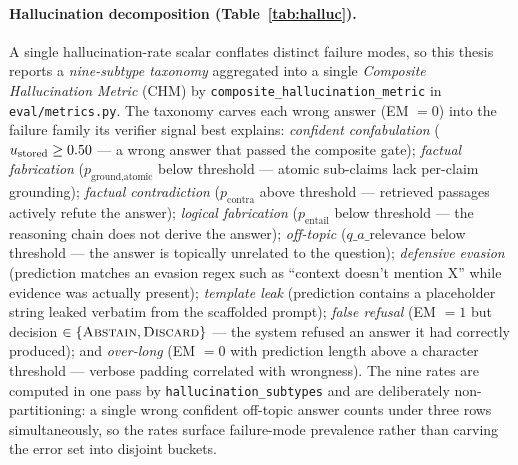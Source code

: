 \paragraph{Hallucination decomposition (Table~\ref{tab:halluc}).}
A single hallucination-rate scalar conflates distinct failure modes, so this thesis reports a \emph{nine-subtype taxonomy} aggregated into a single \emph{Composite Hallucination Metric} (CHM) by \texttt{composite\_hallucination\_metric} in \texttt{eval/metrics.py}. The taxonomy carves each wrong answer (EM $=0$) into the failure family its verifier signal best explains: \emph{confident confabulation} ($u_{\text{stored}} \geq 0.50$ --- a wrong answer that passed the composite gate); \emph{factual fabrication} ($p_{\text{ground,atomic}}$ below threshold --- atomic sub-claims lack per-claim grounding); \emph{factual contradiction} ($p_{\text{contra}}$ above threshold --- retrieved passages actively refute the answer); \emph{logical fabrication} ($p_{\text{entail}}$ below threshold --- the reasoning chain does not derive the answer); \emph{off-topic} ($q\_a\_\text{relevance}$ below threshold --- the answer is topically unrelated to the question); \emph{defensive evasion} (prediction matches an evasion regex such as ``context doesn't mention X'' while evidence was actually present); \emph{template leak} (prediction contains a placeholder string leaked verbatim from the scaffolded prompt); \emph{false refusal} (EM $=1$ but decision $\in\{\textsc{Abstain}, \textsc{Discard}\}$ --- the system refused an answer it had correctly produced); and \emph{over-long} (EM $=0$ with prediction length above a character threshold --- verbose padding correlated with wrongness). The nine rates are computed in one pass by \texttt{hallucination\_subtypes} and are deliberately non-partitioning: a single wrong confident off-topic answer counts under three rows simultaneously, so the rates surface failure-mode prevalence rather than carving the error set into disjoint buckets.

